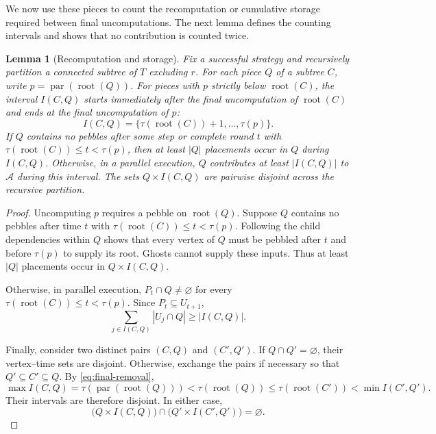\documentclass[11pt]{article}
\newtheorem{lemma}[lemma]{Lemma}
\theoremstyle{definition}
\theoremstyle{remark}
\DeclareMathOperator{\parv}{par}
\newcommand{\Area}{\mathcal A}
\begin{document}
We now use these pieces to count the recomputation or cumulative
storage required between final uncomputations. The next lemma
defines the counting intervals and shows that no contribution
is counted twice.


\begin{lemma}[Recomputation and storage]
\label{lem:charging}
Fix a successful strategy and recursively partition a connected
subtree of $T$ excluding $r$. For each piece $Q$ of a subtree $C$,
write $p=\parv(\operatorname{root}(Q))$. For pieces with $p$
strictly below $\operatorname{root}(C)$, the interval $I(C,Q)$
starts immediately after the final uncomputation of
$\operatorname{root}(C)$ and ends at the final uncomputation of $p$:
\begin{equation}
 I(C,Q)=\{\tau(\operatorname{root}(C))+1,\ldots,\tau(p)\}.
 \label{eq:charge-interval}
\end{equation}
If $Q$ contains no pebbles after some step or complete round
$t$ with $\tau(\operatorname{root}(C))\le t<\tau(p)$, then
at least $|Q|$ placements occur in $Q$ during $I(C,Q)$.
Otherwise, in a parallel execution, $Q$ contributes at least
$|I(C,Q)|$ to $\Area$ during this interval.
The sets $Q\times I(C,Q)$ are pairwise disjoint across
the recursive partition.
\end{lemma}

\begin{proof}
Uncomputing $p$ requires a pebble on $\operatorname{root}(Q)$.
Suppose $Q$ contains no pebbles after time $t$ with
$\tau(\operatorname{root}(C))\le t<\tau(p)$.
Following the child dependencies within $Q$ shows that every
vertex of $Q$ must be pebbled after $t$ and before $\tau(p)$
to supply its root. Ghosts cannot supply these inputs.
Thus at least $|Q|$ placements occur in $Q\times I(C,Q)$.

Otherwise, in parallel execution,
$P_t\cap Q\ne\varnothing$ for every
$\tau(\operatorname{root}(C))\le t<\tau(p)$.
Since $P_t\subseteq U_{t+1}$,
\[
\sum_{j\in I(C,Q)}|U_j\cap Q|\ge |I(C,Q)|.
\]

Finally, consider two distinct pairs $(C,Q)$ and $(C',Q')$.
If $Q\cap Q'=\varnothing$, their vertex--time sets are disjoint.
Otherwise, exchange the pairs if necessary so that
$Q'\subseteq C'\subseteq Q$. By \cref{eq:final-removal},
\[
\max I(C,Q)
=\tau(\parv(\operatorname{root}(Q)))
<\tau(\operatorname{root}(Q))
\le\tau(\operatorname{root}(C'))
<\min I(C',Q').
\]
Their intervals are therefore disjoint. In either case,
\[
\bigl(Q\times I(C,Q)\bigr)
\cap
\bigl(Q'\times I(C',Q')\bigr)=\varnothing.
\]
\end{proof}
\end{document}
